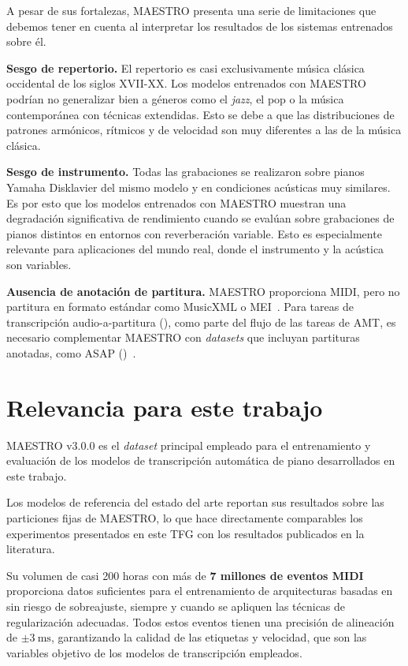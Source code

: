 \documentclass[11pt,spanish,listoffigures,listoftables]{tfgetsinf}
\begin{document}
A pesar de sus fortalezas, MAESTRO presenta una serie de limitaciones que debemos tener en cuenta al interpretar los resultados de los sistemas entrenados sobre él.

\textbf{Sesgo de repertorio.} El repertorio es casi exclusivamente música clásica occidental de los siglos XVII-XX. Los modelos entrenados con MAESTRO podrían no generalizar
bien a géneros como el \textit{jazz}, el pop o la música contemporánea con técnicas extendidas. Esto se debe a que las distribuciones de patrones armónicos, rítmicos y de velocidad son muy diferentes a las de la música clásica.

\textbf{Sesgo de instrumento.} Todas las grabaciones se realizaron sobre pianos Yamaha Disklavier del mismo modelo y en condiciones acústicas muy similares. Es por esto que los
modelos entrenados con MAESTRO muestran una degradación significativa de rendimiento cuando se evalúan sobre grabaciones de pianos distintos en entornos con reverberación variable.
Esto es especialmente relevante para aplicaciones del mundo real, donde el instrumento y la acústica son variables.

\textbf{Ausencia de anotación de partitura.} MAESTRO proporciona MIDI, pero no partitura en formato estándar como MusicXML o MEI~\cite{magenta2020maestrov3}. Para tareas de transcripción audio-a-partitura
(), como parte del flujo de las tareas de AMT, es necesario complementar MAESTRO con \textit{datasets} que incluyan partituras anotadas, como ASAP ()~\cite{foscarin2020asap}.

\section{Relevancia para este trabajo}
\label{sec:maestro_relevancia}
MAESTRO v3.0.0 es el \textit{dataset} principal empleado para el entrenamiento y evaluación de los modelos de transcripción automática de piano desarrollados en este trabajo.

Los modelos de referencia del estado del arte reportan sus resultados sobre las particiones fijas de MAESTRO, lo que
hace directamente comparables los experimentos presentados en este TFG con los resultados publicados en la literatura.

Su volumen de casi 200 horas con más de \textbf{7 millones de eventos MIDI} proporciona datos suficientes para el entrenamiento de arquitecturas basadas en 
sin riesgo de sobreajuste, siempre y cuando se apliquen las técnicas de regularización adecuadas. Todos estos eventos tienen una precisión de alineación de $\pm 3~\mathrm{ms}$, garantizando la calidad de
las etiquetas   y velocidad, que son las variables objetivo de los modelos de transcripción empleados.
\end{document}
